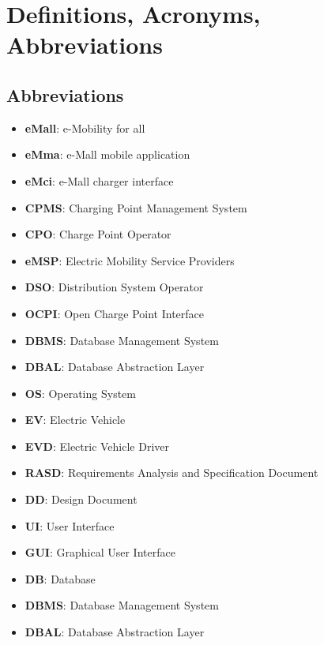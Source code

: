 \section{Definitions, Acronyms, Abbreviations}
\label{sec:Definitions, Acronyms, Abbreviations}%
\subsection{Abbreviations}
\begin{itemize}
    \item \textbf{eMall}: e-Mobility for all
    \item \textbf{eMma}: e-Mall mobile application
    \item \textbf{eMci}: e-Mall charger interface
    \item \textbf{CPMS}: Charging Point Management System
    \item \textbf{CPO}: Charge Point Operator
    \item \textbf{eMSP}: Electric Mobility Service Providers
    \item \textbf{DSO}: Distribution System Operator
    \item \textbf{OCPI}: Open Charge Point Interface
    \item \textbf{DBMS}: Database Management System
    \item \textbf{DBAL}: Database Abstraction Layer
    \item \textbf{OS}: Operating System
    \item \textbf{EV}: Electric Vehicle
    \item \textbf{EVD}: Electric Vehicle Driver
    \item \textbf{RASD}: Requirements Analysis and Specification Document
    \item \textbf{DD}: Design Document
    \item \textbf{UI}: User Interface
    \item \textbf{GUI}: Graphical User Interface
    \item \textbf{DB}: Database
    \item \textbf{DBMS}: Database Management System
    \item \textbf{DBAL}: Database Abstraction Layer
\end{itemize}

